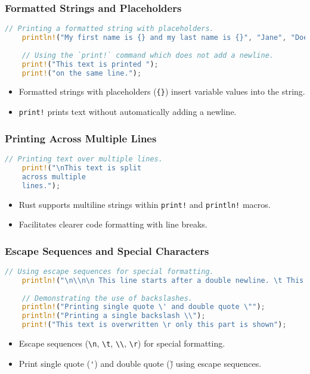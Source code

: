 \documentclass[aspectratio=169, table]{beamer}
\begin{document}
\begin{frame}[fragile]
\frametitle{Formatted Strings and Placeholders}
\begin{lstlisting}[language=Rust]
	// Printing a formatted string with placeholders.
	println!("My first name is {} and my last name is {}", "Jane", "Doe");
	
	// Using the `print!` command which does not add a newline.
	print!("This text is printed ");
	print!("on the same line.");
\end{lstlisting}
\begin{itemize}
	\item Formatted strings with placeholders (\texttt{\{\}}) insert variable values into the string.
	\item \texttt{print!} prints text without automatically adding a newline.
\end{itemize}
\end{frame}



\begin{frame}[fragile]
\frametitle{Printing Across Multiple Lines}
\begin{lstlisting}[language=Rust]
	// Printing text over multiple lines.
	print!("\nThis text is split
	across multiple 
	lines."); 
\end{lstlisting}
\begin{itemize}
	\item Rust supports multiline strings within \texttt{print!} and \texttt{println!} macros.
	\item Facilitates clearer code formatting with line breaks.
\end{itemize}
\end{frame}



\begin{frame}[fragile]
\frametitle{Escape Sequences and Special Characters}
\vspace{10pt}
\begin{lstlisting}[language=Rust]
	// Using escape sequences for special formatting.
	println!("\n\\n\n This line starts after a double newline. \t This line has a tab.");
	
	// Demonstrating the use of backslashes.
	println!("Printing single quote \' and double quote \"");
	println!("Printing a single backslash \\");
	print!("This text is overwritten \r only this part is shown");
\end{lstlisting}
\begin{itemize}
	\item Escape sequences (\texttt{\textbackslash n}, \texttt{\textbackslash t}, \texttt{\textbackslash\textbackslash}, \texttt{\textbackslash r}) for special formatting.
	\item Print single quote (\texttt{\'}) and double quote (\texttt{\"}) using escape sequences.
\end{itemize}
\end{frame}
\end{document}
